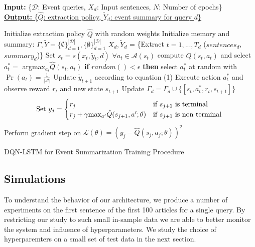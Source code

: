 \documentclass[12pt]{article}
\begin{document}
\begin{algorithm}
    \textbf{Input:} { \rm  \{$\mathcal{D}$: Event queries, $X_d$: Input sentences, $N$: Number of epochs\} } \\
    \underline{\textbf{Output:} \rm \{$\hat{Q}$: extraction policy, $\tilde{Y}_d$: event summary for query $d$\} }
\begin{algorithmic}[1]
\vspace{-0.5cm}
\STATE \rm Initialize extraction policy $\hat{Q}$ with random weights
\STATE \rm Initialize memory and summary: $\Gamma, \tilde{Y} =  \{\emptyset \}^{\mathcal{|D|}}_{d=1},  \{\emptyset \}^{\mathcal{|D|}}_{d=1} $
		\STATE $X_{d}, \tilde{Y}_{d}$ = \{Extract $t=1,...,T_d$ ($sentences_d$, $summary_d$)\}
			\STATE Set $s_t = s(x_t, \tilde{y}_t, d)$
			\STATE $ \forall a_t \in \mathcal{A}(s_t)$ \textrm{compute} $\hat{Q}(s_t, a_t)$ and select $a^{*}_t =$ argmax$_{a_{t}}\hat{Q}(s_t, a_t)$
			\STATE  \textbf{if} $random() < \epsilon$ \textbf{then} select $a^{*}_t $ at random with $\Pr(a_t) =\frac{1}{| \mathcal{A} |} $
			\STATE Update $\tilde{y}_{t+1}$ according to equation (1)
			\STATE Execute action $a^{*}_t$ and observe reward $r_t$ and new state $s_{t+1}$
			\STATE Update $\Gamma_d = \Gamma_d \cup \{ [s_t, a^{*}_t, r_t, s_{t+1}]\}$
		\ENDFOR
	\ENDFOR
			\STATE \[\textrm{Set } y_j =
					\begin{cases}
						r_j              								& \text{if $s_{j+1}$ is terminal } \\
					     	r_j + \gamma $max$_{a'}\hat{Q}(s_{j+1}, a'; \theta) 	& \text{if $s_{j+1}$ is non-terminal } 
					\end{cases} 
					\]
        			\STATE Perform gradient step on $\mathcal{L}(\theta) = (y_j - \hat{Q}(s_j, a_j; \theta))^2$
		\ENDFOR
\ENDFOR
  \end{algorithmic}
    \caption{DQN-LSTM for Event Summarization Training Procedure}
\end{algorithm}


\subsection{Simulations}
To understand the behavior of our architecture, we produce a number of experiments on the first sentence of the first 100 articles for a single query. By restricting our study to such small in-sample data we are able to better monitor the system and influence of hyperparameters. We study the choice of hyperparemters on a small set of test data in the next section.
\end{document}
